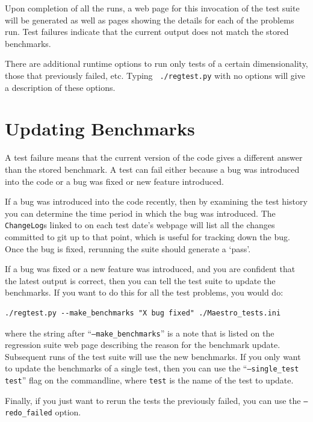 Upon completion of all the runs, a web page for this invocation of the
test suite will be generated as well as pages showing the details for
each of the problems run.  Test failures indicate that the current
output does not match the stored benchmarks.

There are additional runtime options to run only tests of a certain
dimensionality, those that previously failed, etc.  Typing {\tt
  ./regtest.py} with no options will give a description of these
options.


\section{Updating Benchmarks}

A test failure means that the current version of the code gives a
different answer than the stored benchmark.  A test can fail either
because a bug was introduced into the code or a bug was fixed or new
feature introduced.

If a bug was introduced into the code recently, then by examining the
test history you can determine the time period in which the bug was
introduced.  The {\tt ChangeLog}s linked to on each test date's webpage
will list all the changes committed to git up to that point, which is
useful for tracking down the bug.  Once the bug is fixed, rerunning
the suite should generate a `pass'.

If a bug was fixed or a new feature was introduced, and you are
confident that the latest output is correct, then you can tell the
test suite to update the benchmarks.  If you want to do this for all
the test problems, you would do:
\begin{verbatim}
./regtest.py --make_benchmarks "X bug fixed" ./Maestro_tests.ini
\end{verbatim}
where the string after ``{\tt --make\_benchmarks}'' is a note that is listed
on the regression suite web page describing the reason for the benchmark
update.  Subsequent runs of the test suite will use the new benchmarks.
If you only want to update the benchmarks of a single test, then you
can use the ``{\tt --single\_test test}'' flag on the commandline, where
{\tt test} is the name of the test to update.

Finally, if you just want to rerun the tests the previously failed,
you can use the {\tt --redo\_failed} option.
